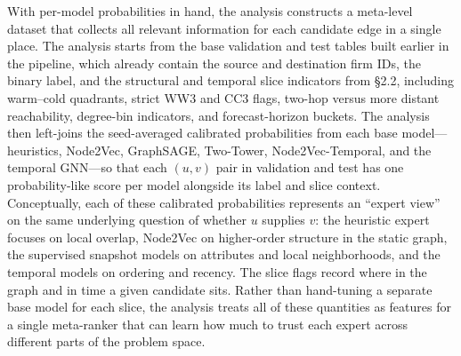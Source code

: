 With per-model probabilities in hand, the analysis constructs a meta-level dataset that collects all relevant information for each candidate edge in a single place. The analysis starts from the base validation and test tables built earlier in the pipeline, which already contain the source and destination firm IDs, the binary label, and the structural and temporal slice indicators from \S2.2, including warm--cold quadrants, strict WW3 and CC3 flags, two-hop versus more distant reachability, degree-bin indicators, and forecast-horizon buckets. The analysis then left-joins the seed-averaged calibrated probabilities from each base model---heuristics, Node2Vec, GraphSAGE, Two-Tower, Node2Vec-Temporal, and the temporal GNN---so that each \((u,v)\) pair in validation and test has one probability-like score per model alongside its label and slice context. Conceptually, each of these calibrated probabilities represents an ``expert view'' on the same underlying question of whether \(u\) supplies \(v\): the heuristic expert focuses on local overlap, Node2Vec on higher-order structure in the static graph, the supervised snapshot models on attributes and local neighborhoods, and the temporal models on ordering and recency. The slice flags record where in the graph and in time a given candidate sits. Rather than hand-tuning a separate base model for each slice, the analysis treats all of these quantities as features for a single meta-ranker that can learn how much to trust each expert across different parts of the problem space.

